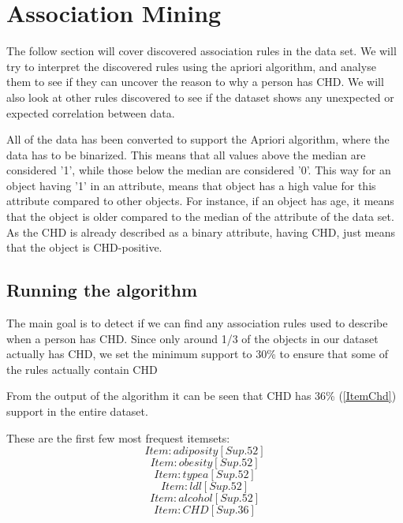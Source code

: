 \section{Association Mining}
The follow section will cover discovered association rules in the data set. We will try to interpret the discovered rules using the apriori algorithm, and analyse them to see if they can uncover the reason to why a person has CHD. We will also look at other rules discovered to see if the dataset shows any unexpected or expected correlation between data.

All of the data has been converted to support the Apriori algorithm, where the data has to be binarized. This means that all values above the median are considered '1', while those below the median are considered '0'. This way for an object having '1' in an attribute, means that object has a high value for this attribute compared to other objects. For instance, if an object has age, it means that the object is older compared to the median of the attribute of the data set. As the CHD is already described as a binary attribute, having CHD, just means that the object is CHD-positive.

\subsection{Running the algorithm}
The main goal is to detect if we can find any association rules used to describe when a person has CHD. Since only around 1/3 of the objects in our dataset actually has CHD, we set the minimum support to 30\% to ensure that some of the rules actually contain CHD

From the output of the algorithm it can be seen that CHD has 36\% (\ref{ItemChd}) support in the entire dataset.

These are the first few most frequest itemsets:
\begin{equation}
\label{ItemAdi}
Item: adiposity[Sup. 52]
\end{equation}
\begin{equation}
\label{ItemObe}
Item: obesity[Sup. 52]
\end{equation}
\begin{equation}
\label{ItemTypea}
Item: typea[Sup. 52]
\end{equation}
\begin{equation}
\label{ItemLdl}
Item: ldl[Sup. 52]
\end{equation}
\begin{equation}
\label{ItemAlco}
Item: alcohol[Sup. 52]
\end{equation}
\begin{equation}
\label{ItemChd}
Item: CHD[Sup. 36]
\end{equation}


